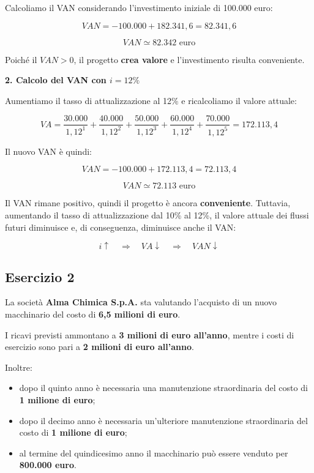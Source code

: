 \noindent Calcoliamo il VAN considerando l'investimento iniziale di 100.000 euro:

\[
VAN=-100.000+182.341,6=82.341,6
\]

\[
\boxed{VAN\simeq82.342\text{ euro}}
\]

\noindent Poiché il $VAN>0$, il progetto \textbf{crea valore} e l'investimento risulta conveniente.

\medskip
\noindent\textbf{2. Calcolo del VAN con $i=12\%$}

\noindent Aumentiamo il tasso di attualizzazione al 12\% e ricalcoliamo il valore attuale:

\[
VA=
\frac{30.000}{1,12^1}+
\frac{40.000}{1,12^2}+
\frac{50.000}{1,12^3}+
\frac{60.000}{1,12^4}+
\frac{70.000}{1,12^5}
=172.113,4
\]

\noindent Il nuovo VAN è quindi:

\[
VAN=-100.000+172.113,4=72.113,4
\]

\[
\boxed{VAN\simeq72.113\text{ euro}}
\]

\noindent Il VAN rimane positivo, quindi il progetto è ancora \textbf{conveniente}. Tuttavia, aumentando il tasso di attualizzazione dal 10\% al 12\%, il valore attuale dei flussi futuri diminuisce e, 
di conseguenza, diminuisce anche il VAN:

\[
i\uparrow\quad\Rightarrow\quad VA\downarrow\quad\Rightarrow\quad VAN\downarrow
\]
\newpage
\subsection{Esercizio 2}

La società \textbf{Alma Chimica S.p.A.} sta valutando l'acquisto di un nuovo macchinario del costo di \textbf{6,5 milioni di euro}.

\noindent I ricavi previsti ammontano a \textbf{3 milioni di euro all'anno}, mentre i costi di esercizio sono pari a \textbf{2 milioni di euro all'anno}.

\noindent Inoltre:
\begin{itemize}
    \item dopo il quinto anno è necessaria una manutenzione straordinaria del costo di \textbf{1 milione di euro};
    \item dopo il decimo anno è necessaria un'ulteriore manutenzione straordinaria del costo di \textbf{1 milione di euro};
    \item al termine del quindicesimo anno il macchinario può essere venduto per \textbf{800.000 euro}.
\end{itemize}

